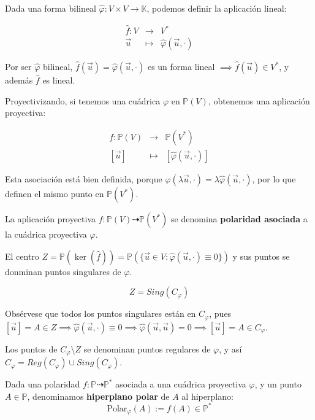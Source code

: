 Dada una forma bilineal $\hat{\varphi} : V \times V \to \mathbb{K}$, podemos definir la aplicación lineal:

\[
    \begin{matrix}
        \hat{f} : V & \to & V^* \\
        \vec{u} & \mapsto & \hat{\varphi}(\vec{u}, \cdot)
    \end{matrix}
\]

Por ser $\hat{\varphi}$ bilineal, $\hat{f}(\vec{u}) = \hat{\varphi}(\vec{u}, \cdot)$ es un forma lineal $\implies \hat{f}(\vec{u}) \in V^*$, y además $\hat{f}$ es lineal.

Proyectivizando, si tenemos una cuádrica $\varphi$ en $\mathbb{P}(V)$, obtenemos una aplicación proyectiva:

\[
    \begin{matrix}
        f : \mathbb{P}(V) & \to & \mathbb{P}(V^*) \\
        [\vec{u}] & \mapsto & [\hat{\varphi}(\vec{u}, \cdot)]
    \end{matrix}
\]

Esta asociación está bien definida, porque $\hat{\varphi}(\lambda \vec{u}, \cdot) = \lambda \hat{\varphi}(\vec{u}, \cdot)$, por lo que definen el mismo punto en $\mathbb{P}(V^*)$.\\

\begin{definición} 
    La aplicación proyectiva $f : \mathbb{P}(V) \dashrightarrow  \mathbb{P}(V^*)$ se denomina \textbf{polaridad asociada} a la cuádrica proyectiva $\varphi$.
\end{definición}

El centro $Z = \mathbb{P}(\ker(\hat{f})) = \mathbb{P}(\{\vec{u} \in V : \hat{\varphi}(\vec{u}, \cdot) \equiv 0 \})$ y sus puntos se donminan puntos singulares de $\varphi$.

\[
    Z = Sing(C_{\varphi}) 
\]

Obsérvese que todos los puntos singulares están en $C_{\varphi}$, pues $[\vec{u}] = A \in Z \implies \hat{\varphi}(\vec{u}, \cdot) \equiv 0 \implies \hat{\varphi}(\vec{u}, \vec{u}) = 0 \implies [\vec{u}] = A \in C_{\varphi}$.

Los puntos de $C_{\varphi} \setminus Z$ se denominan puntos regulares de $\varphi$, y así $C_{\varphi} = Reg(C_{\varphi}) \cup Sing(C_{\varphi})$.

\begin{definición}
    Dada una polaridad $f : \mathbb{P} \dashrightarrow \mathbb{P}^*$ asociada a una cuádrica proyectiva $\varphi$, y un punto $A \in \mathbb{P}$, denominamos \textbf{hiperplano polar} de $A$ al hiperplano:
    \[
        \text{Polar}_\varphi(A) := f(A) \in \mathbb{P}^*
    \]
\end{definición}

